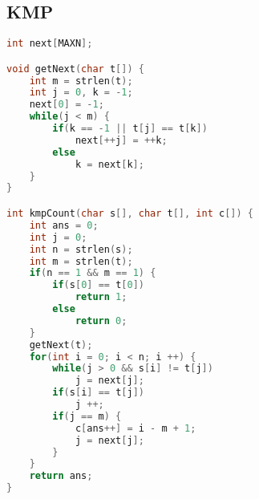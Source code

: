\subsection{KMP}
    \begin{lstlisting}[language=c++]
int next[MAXN];

void getNext(char t[]) {
    int m = strlen(t);
    int j = 0, k = -1;
    next[0] = -1;
    while(j < m) {
        if(k == -1 || t[j] == t[k])
            next[++j] = ++k;
        else 
            k = next[k];
    }
}

int kmpCount(char s[], char t[], int c[]) {
    int ans = 0;
    int j = 0;
    int n = strlen(s);
    int m = strlen(t);
    if(n == 1 && m == 1) {
        if(s[0] == t[0])
            return 1;
        else 
            return 0;
    }
    getNext(t);
    for(int i = 0; i < n; i ++) {
        while(j > 0 && s[i] != t[j])
            j = next[j];
        if(s[i] == t[j])
            j ++;
        if(j == m) {
            c[ans++] = i - m + 1;
            j = next[j];
        }
    }
    return ans;
}
    \end{lstlisting}
